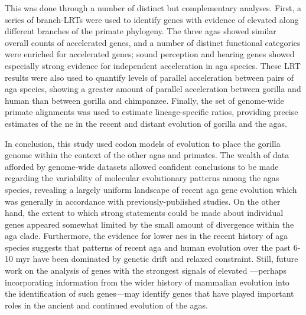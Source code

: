 This was done through a number of distinct but complementary
analyses. First, a series of branch-LRTs were used to identify genes
with evidence of elevated \dnds along different branches of the
primate phylogeny. The three \acp{aga} showed similar overall counts
of accelerated genes, and a number of distinct functional categories
were enriched for accelerated genes; sound perception and hearing
genes showed especially strong evidence for independent acceleration
in \ac{aga} species. These LRT results were also used to quantify
levels of parallel acceleration between pairs of \ac{aga} species,
showing a greater amount of parallel acceleration between gorilla and
human than between gorilla and chimpanzee. Finally, the set of
genome-wide primate alignments was used to estimate lineage-specific
\dnds ratios, providing precise estimates of the \acf{ne} in the
recent and distant evolution of gorilla and the \acp{aga}.

In conclusion, this study used codon models of evolution to place the
gorilla genome within the context of the other \acp{aga} and
primates. The wealth of data afforded by genome-wide datasets allowed
confident conclusions to be made regarding the variability of
molecular evolutionary patterns among the \acp{aga} species, revealing
a largely uniform landscape of recent \ac{aga} gene evolution which
was generally in accordance with previously-published studies. On the
other hand, the extent to which strong statements could be made about
individual genes appeared somewhat limited by the small amount of
divergence within the \ac{aga} clade. Furthermore, the evidence for
lower \acp{ne} in the recent history of \ac{aga} species suggests that
patterns of recent \ac{aga} and human evolution over the past 6-10
\ac{myr} have been dominated by genetic drift and relaxed
constraint. Still, future work on the analysis of genes with the
strongest signals of elevated \dnds---perhaps incorporating
information from the wider history of mammalian evolution into the
identification of such genes---may identify genes that have played
important roles in the ancient and continued evolution of the
\aclp{aga}.
